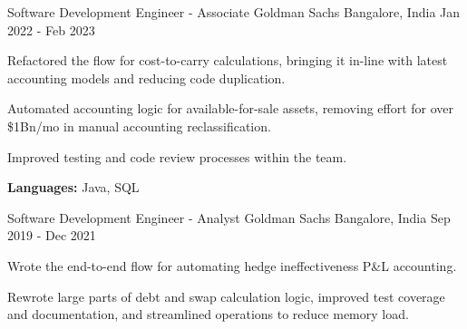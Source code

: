 

\begin{cventries}

  \cventry
    {Software Development Engineer - Associate} %
    {Goldman Sachs} %
    {Bangalore, India} %
    {Jan 2022 - Feb 2023} %
    {
      \begin{cvitems} %
        \item {Refactored the flow for cost-to-carry calculations, bringing it in-line with latest accounting models and reducing code duplication.}
        \item {Automated accounting logic for available-for-sale assets, removing effort for over \$1Bn/mo in manual accounting reclassification.}
        \item {Improved testing and code review processes within the team.}
        \item {\textbf{Languages:} Java, SQL}
      \end{cvitems}
    }

  \cventry
    {Software Development Engineer - Analyst} %
    {Goldman Sachs} %
    {Bangalore, India} %
    {Sep 2019 - Dec 2021} %
    {
      \begin{cvitems} %
        \item {Wrote the end-to-end flow for automating hedge ineffectiveness P\&L accounting.}
        \item {Rewrote large parts of debt and swap calculation logic, improved test coverage and documentation, and streamlined operations to reduce memory load.}
      \end{cvitems}
    }

\end{cventries}
